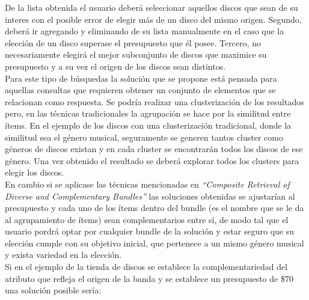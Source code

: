 De la lista obtenida el usuario deberá seleccionar aquellos discos que sean de su interes con el posible error de elegir más de un disco del mismo origen. Segundo, deberá ir agregando y eliminando de su lista manualmente en el caso que la elección de un disco superase el presupuesto que él posee. Tercero, no necesariamente elegirá el mejor subconjunto de discos que maximice su presupuesto y a su vez el origen de los discos sean distintos.\\
Para este tipo de búsquedas la solución que se propone está pensada para aquellas consultas que requieren obtener un conjunto de elementos que se relacionan como respuesta. Se podría realizar una clusterización de los resultados pero, en las técnicas tradicionales la agrupación se hace por la similitud entre ítems. En el ejemplo de los discos con una clusterización tradicional, donde la similitud sea el género musical, seguramente se generen tantos cluster como géneros de discos existan y en cada cluster se encontrarán todos los discos de ese género. Una vez obtenido el resultado se deberá explorar todos los clusters para elegir los discos.\\
En cambio si se aplicase las técnicas mencionadas en \textit{``Composite Retrieval of Diverse and Complementary Bundles''} las soluciones obtenidas se ajustarían al presupuesto y cada uno de los ítems dentro del bundle (es el nombre que se le da al agrupamiento de ítems) sean complementarios entre sí, de modo tal que el usuario pordrá optar por cualquier bundle de la solución y estar seguro que su elección cumple con su objetivo inicial, que pertenece a un mismo género musical y exista variedad en la elección.\\
Si en el ejemplo de la tienda de discos se establece la complementariedad del atributo que refleja el origen de la banda y se establece un presupuesto de \$70 una solución posible sería:
